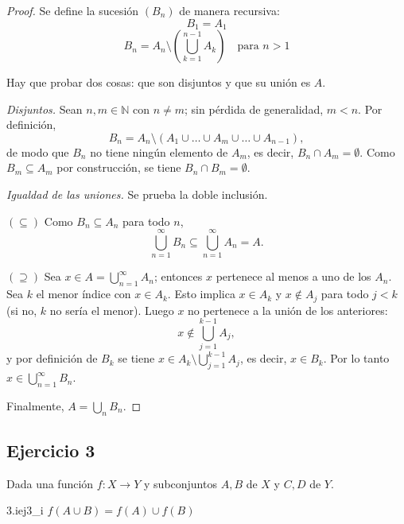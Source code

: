 \documentclass[11pt, a4paper]{article}
\begin{document}
\begin{proof}
Se define la sucesión $(B_n)$ de manera recursiva:
$$ B_1 = A_1 $$
$$ B_n = A_n \setminus \left( \bigcup_{k=1}^{n-1} A_k \right) \quad \text{para } n > 1 $$

Hay que probar dos cosas: que son disjuntos y que su unión es $A$.

\textit{Disjuntos.} Sean $n, m \in \mathbb{N}$ con $n \neq m$; sin pérdida de generalidad, $m < n$.
Por definición,
$$ B_n = A_n \setminus (A_1 \cup \dots \cup A_m \cup \dots \cup A_{n-1}), $$
de modo que $B_n$ no tiene ningún elemento de $A_m$, es decir, $B_n \cap A_m = \emptyset$. Como
$B_m \subseteq A_m$ por construcción, se tiene $B_n \cap B_m = \emptyset$.

\textit{Igualdad de las uniones.} Se prueba la doble inclusión.

$(\subseteq)$ Como $B_n \subseteq A_n$ para todo $n$,
$$ \bigcup_{n=1}^{\infty} B_n \subseteq \bigcup_{n=1}^{\infty} A_n = A. $$

$(\supseteq)$ Sea $x \in A = \bigcup_{n=1}^{\infty} A_n$; entonces $x$ pertenece al menos a uno de los
$A_n$. Sea $k$ el menor índice con $x \in A_k$. Esto implica $x \in A_k$ y $x \notin A_j$ para todo
$j < k$ (si no, $k$ no sería el menor). Luego $x$ no pertenece a la unión de los anteriores:
$$ x \notin \bigcup_{j=1}^{k-1} A_j, $$
y por definición de $B_k$ se tiene $x \in A_k \setminus \bigcup_{j=1}^{k-1} A_j$, es decir,
$x \in B_k$. Por lo tanto $x \in \bigcup_{n=1}^{\infty} B_n$.

Finalmente, $A=\bigcup_{n}B_{n}$.
\end{proof}

\subsection*{Ejercicio 3}

Dada una función $f:X\longrightarrow Y$ y subconjuntos $A, B$ de $X$ y $C, D$ de $Y$.

\begin{proposicion}{3.i}{ej3_i}
$f(A\cup B)=f(A)\cup f(B)$
\end{proposicion}
\end{document}
